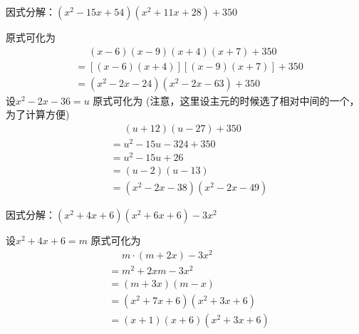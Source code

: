 \documentclass[windows,csize4]{BHCexam}
\begin{document}
\begin{groups}
\begin{questions}[]
        \question[5] 因式分解：$(x^2-15x+54)(x^2+11x+28)+350$
        \begin{solution}{0.5cm}
            \methodonly 原式可化为
            \[
                \begin{aligned}
                     & \phantom{=}(x-6)(x-9)(x+4)(x+7)+350 \\
                     & = [(x-6)(x+4)][(x-9)(x+7)] + 350    \\
                     & = (x^2-2x-24)(x^2-2x-63) +350
                \end{aligned}
            \]
            设$x^2-2x-36=u$ 原式可化为 (注意，这里设主元的时候选了相对中间的一个，为了计算方便)
            \[
                \begin{aligned}
                     & \phantom{=}(u+12)(u-27)+350 \\
                     & = u^2-15u-324 + 350         \\
                     & = u^2-15u+26                \\
                     & = (u-2)(u-13)               \\
                     & = (x^2-2x-38)(x^2-2x-49)
                \end{aligned}
            \]
        \end{solution}
        \vspace{3.5cm}

        \question[5] 因式分解：$(x^2+4x+6)(x^2+6x+6)-3x^2$
        \begin{solution}{0.5cm}
            \methodonly 设$x^2+4x+6=m$ 原式可化为
            \[
                \begin{aligned}
                     & \phantom{=}m\cdot (m+2x) -3x^2 \\
                     & = m^2+2xm-3x^2                 \\
                     & = (m+3x)(m-x)                  \\
                     & = (x^2+7x+6)(x^2+3x+6)         \\
                     & = (x+1)(x+6)(x^2+3x+6)
                \end{aligned}
            \]
        \end{solution}
        \vspace{3.5cm}


\end{questions}
\end{groups}
\end{document}
